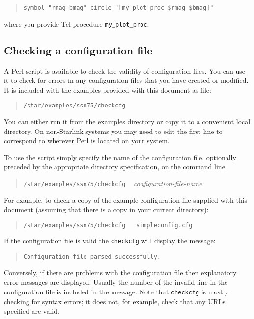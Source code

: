 \documentclass[twoside,11pt,nolof,chapters]{starlink}
\begin{document}
\begin{quote}
\texttt{symbol "rmag bmag" circle "[my\_plot\_proc \$rmag \$bmag]"}
\end{quote}

where you provide Tcl procedure \texttt{my\_plot\_proc}.

\subsection{\label{CHECKCFG_R}Checking a configuration file}

A Perl script is available to check the validity of configuration files.
You can use it to check for errors in any configuration files that you
have created or modified.  It is included with the examples provided with
this document as file:

\begin{quote}
\texttt{/star/examples/ssn75/checkcfg}
\end{quote}

You can either run it from the examples directory or copy it to a
convenient local directory.  On non-Starlink systems you may need to edit
the first line to correspond to wherever Perl is located on your system.

To use the script simply specify the name of the configuration file,
optionally preceded by the appropriate directory specification, on the
command line:

\begin{quote}
\texttt{/star/examples/ssn75/checkcfg} ~ \textit{configuration-file-name}
\end{quote}

For example, to check a copy of the example configuration file supplied
with this document (assuming that there is a copy in your current
directory):

\begin{quote}
\texttt{/star/examples/ssn75/checkcfg ~ simpleconfig.cfg}
\end{quote}

If the configuration file is valid the \texttt{checkcfg} will display the
message:

\begin{quote}
\texttt{Configuration file parsed successfully.}
\end{quote}

Conversely, if there are problems with the configuration file then
explanatory error messages are displayed.  Usually the number of the
invalid line in the configuration file is included in the message.
Note that \texttt{checkcfg} is mostly checking for syntax errors; it does
not, for example, check that any URLs specified are valid.
\end{document}
